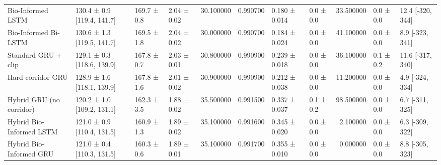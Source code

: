 \begin{tabular}{llllrrllrll}
Bio-Informed LSTM & 130.4 ± 0.9 [119.4, 141.7] & 169.7 ± 0.8 & 2.04 ± 0.02 & 30.100000 & 0.990700 & 0.180 ± 0.014 & 0.0 ± 0.0 & 33.500000 & 0.0 ± 0.0 & 12.4 [-320, 344] \\
Bio-Informed Bi-LSTM & 130.6 ± 1.3 [119.5, 141.7] & 169.5 ± 1.8 & 2.04 ± 0.02 & 30.000000 & 0.990700 & 0.184 ± 0.024 & 0.0 ± 0.0 & 41.100000 & 0.0 ± 0.0 & 8.9 [-323, 341] \\
Standard GRU + clip & 129.1 ± 0.3 [118.6, 139.9] & 167.8 ± 0.7 & 2.03 ± 0.01 & 30.800000 & 0.990900 & 0.239 ± 0.018 & 0.0 ± 0.0 & 36.100000 & 0.1 ± 0.2 & 11.6 [-317, 340] \\
Hard-corridor GRU & 128.9 ± 1.6 [118.1, 139.9] & 167.8 ± 1.6 & 2.01 ± 0.02 & 30.900000 & 0.990900 & 0.212 ± 0.038 & 0.0 ± 0.0 & 11.200000 & 0.0 ± 0.0 & 4.9 [-324, 334] \\
Hybrid GRU (no corridor) & 120.2 ± 1.0 [109.2, 131.1] & 162.3 ± 3.5 & 1.88 ± 0.02 & 35.500000 & 0.991500 & 0.337 ± 0.037 & 0.1 ± 0.2 & 98.500000 & 0.0 ± 0.0 & 6.7 [-311, 325] \\
Hybrid Bio-Informed LSTM & 121.0 ± 0.9 [110.4, 131.5] & 160.9 ± 1.3 & 1.89 ± 0.02 & 35.100000 & 0.991600 & 0.345 ± 0.020 & 0.0 ± 0.0 & 2.100000 & 0.0 ± 0.0 & 6.3 [-309, 322] \\
Hybrid Bio-Informed GRU & 121.0 ± 0.4 [110.3, 131.5] & 160.3 ± 0.6 & 1.89 ± 0.01 & 35.100000 & 0.991700 & 0.355 ± 0.010 & 0.0 ± 0.0 & 0.000000 & 0.0 ± 0.0 & 8.8 [-305, 323] \\
\bottomrule
\end{tabular}
